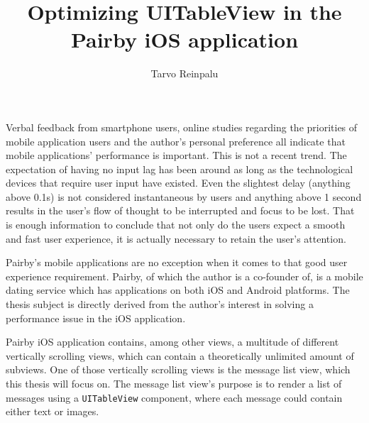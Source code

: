 \documentclass[a4paper,12pt]{article}
\begin{document}
\begin{itkTitlePage}
\title{Optimizing UITableView in the Pairby iOS application}
\author{Tarvo Reinpalu}
\end{itkTitlePage}




\itkMakeAuthorDeclaration

\clearpage
\thispagestyle{empty}
\tableofcontents
\newpage




\newpage
{}
Verbal feedback from smartphone users, online studies regarding the priorities of mobile application users\cite{AppSpeedStudyHP}\cite{AppSpeedStudyApigee} and the author's personal preference all indicate that mobile applications' performance is important. This is not a recent trend. The expectation of having no input lag has been around as long as the technological devices that require user input have existed.\cite{NielsenUsabilityEngineering} Even the slightest delay (anything above 0.1s) is not considered instantaneous by users and anything above 1 second results in the user's flow of thought to be interrupted and focus to be lost.\cite{NielsenUsabilityEngineering} That is enough information to conclude that not only do the users expect a smooth and fast user experience, it is actually necessary to retain the user's attention.

Pairby's mobile applications are no exception when it comes to that good user experience requirement. Pairby, of which the author is a co-founder of, is a mobile dating service which has applications on both iOS and Android platforms. The thesis subject is directly derived from the author's interest in solving a performance issue in the iOS application.

Pairby iOS application contains, among other views, a multitude of different vertically scrolling views, which can contain a theoretically unlimited amount of subviews. One of those vertically scrolling views is the message list view, which this thesis will focus on. The message list view's purpose is to render a list of messages using a \texttt{UITableView} component, where each message could contain either text or images.
\end{document}
